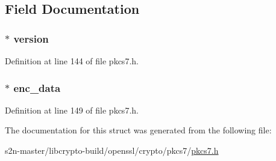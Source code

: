 \subsection{Field Documentation}
\subsubsection[{\texorpdfstring{version}{version}}]{ $\ast$ version}\hypertarget{structpkcs7__signedandenveloped__st_abf367aeef355b6acf5be7c569c4b28b0}{}\label{structpkcs7__signedandenveloped__st_abf367aeef355b6acf5be7c569c4b28b0}


Definition at line 144 of file pkcs7.\+h.

\subsubsection[{\texorpdfstring{enc\+\_\+data}{enc_data}}]{ $\ast$ enc\+\_\+data}\hypertarget{structpkcs7__signedandenveloped__st_a39e0a8da41ac4871f293d76368a9a0e7}{}\label{structpkcs7__signedandenveloped__st_a39e0a8da41ac4871f293d76368a9a0e7}


Definition at line 149 of file pkcs7.\+h.



The documentation for this struct was generated from the following file\+:\begin{DoxyCompactItemize}
\item 
s2n-\/master/libcrypto-\/build/openssl/crypto/pkcs7/\hyperlink{crypto_2pkcs7_2pkcs7_8h}{pkcs7.\+h}\end{DoxyCompactItemize}
